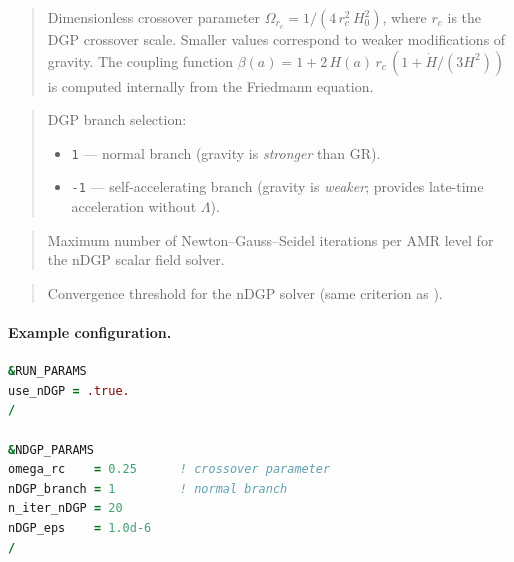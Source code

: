 \begin{quote}
Dimensionless crossover parameter $\Omega_{r_c} = 1/(4\,r_c^2\,H_0^2)$,
where $r_c$ is the DGP crossover scale.  Smaller values correspond to
weaker modifications of gravity.  The coupling function
$\beta(a) = 1 + 2\,H(a)\,r_c\,(1 + \dot{H}/(3H^2))$ is computed
internally from the Friedmann equation.
\end{quote}

\label{param:nDGP_branch}

\begin{quote}
DGP branch selection:
\begin{itemize}[nosep]
  \item \texttt{1} --- normal branch (gravity is \emph{stronger} than GR).
  \item \texttt{-1} --- self-accelerating branch (gravity is
        \emph{weaker}; provides late-time acceleration without $\Lambda$).
\end{itemize}
\end{quote}

\label{param:n_iter_nDGP}

\begin{quote}
Maximum number of Newton--Gauss--Seidel iterations per AMR level for
the nDGP scalar field solver.
\end{quote}

\label{param:nDGP_eps}

\begin{quote}
Convergence threshold for the nDGP solver (same criterion as
).
\end{quote}

\paragraph{Example configuration.}
\begin{lstlisting}[language=Fortran]
&RUN_PARAMS
use_nDGP = .true.
/

&NDGP_PARAMS
omega_rc    = 0.25      ! crossover parameter
nDGP_branch = 1         ! normal branch
n_iter_nDGP = 20
nDGP_eps    = 1.0d-6
/
\end{lstlisting}


